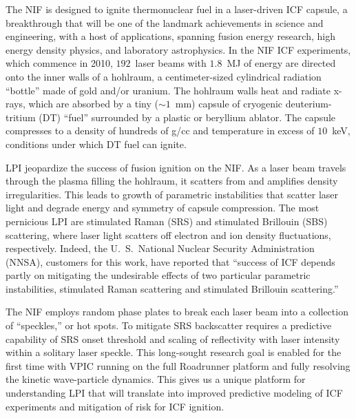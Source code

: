 \documentclass[journal,twoside]{IEEEtran}
\newcommand{\abinitio} {\textit{ab initio}}
\begin{document}
The NIF is designed to ignite thermonuclear fuel in a laser-driven ICF
capsule, a breakthrough that will be one of the landmark achievements
in science and engineering, with a host of applications, spanning
fusion energy research, high energy density physics, and laboratory
astrophysics.  In the NIF ICF experiments, which commence in 2010,
$192$~laser beams with $1.8$~MJ of energy are directed onto the inner
walls of a hohlraum, a centimeter-sized cylindrical radiation
``bottle'' made of gold and/or uranium.  The hohlraum walls heat and
radiate x-rays, which are absorbed by a tiny ($\sim 1$~mm) capsule of
cryogenic deuterium-tritium (DT) ``fuel'' surrounded by a plastic or
beryllium ablator.  The capsule compresses to a density of hundreds of
g/cc and temperature in excess of $10$~keV, conditions under which DT
fuel can ignite.

LPI jeopardize the success of fusion ignition on the NIF.  As a laser
beam travels through the plasma filling the hohlraum, it scatters from
and amplifies density irregularities.  This leads to growth of
parametric instabilities that scatter laser light and degrade energy
and symmetry of capsule compression.  The most pernicious LPI are
stimulated Raman (SRS) and stimulated Brillouin (SBS) scattering,
where laser light scatters off electron and ion density fluctuations,
respectively.  Indeed, the U.~S.~National Nuclear Security
Administration (NNSA), customers for this work, have reported that
``success of ICF depends partly on mitigating the undesirable effects
of two particular parametric instabilities, stimulated Raman
scattering and stimulated Brillouin
scattering.''~\cite{LLNL_LPI_webpage}



The NIF employs random phase plates to break each laser beam into a 
collection of ``speckles,'' or hot spots.  To mitigate SRS backscatter
requires a predictive capability of SRS onset threshold and scaling 
of reflectivity with laser intensity within a solitary laser speckle.  
This long-sought research goal is enabled for the first time with VPIC
running on the full Roadrunner platform and fully resolving the kinetic
wave-particle dynamics. This gives us a unique platform for understanding
LPI that will translate into improved predictive modeling of ICF experiments
and mitigation of risk for ICF ignition. 
\end{document}
